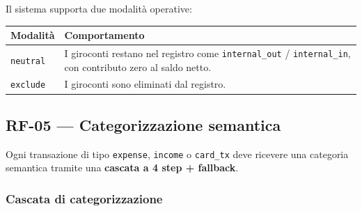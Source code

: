 \documentclass[11pt, a4paper]{article}
\begin{document}
Il sistema supporta due modalità operative:

\begin{center}
\begin{tabular}{@{}L{4cm} L{8.5cm}@{}}
\toprule
\textbf{Modalità} & \textbf{Comportamento} \\
\midrule
\texttt{neutral} & I giroconti restano nel registro come \texttt{internal\_out} /
                   \texttt{internal\_in}, con contributo zero al saldo netto. \\
\texttt{exclude} & I giroconti sono eliminati dal registro. \\
\bottomrule
\end{tabular}
\end{center}

\subsection{RF-05 --- Categorizzazione semantica}
\label{sec:rf05}

Ogni transazione di tipo \texttt{expense}, \texttt{income} o \texttt{card\_tx} deve
ricevere una categoria semantica tramite una \textbf{cascata a 4 step + fallback}.

\subsubsection{Cascata di categorizzazione}
\end{document}
